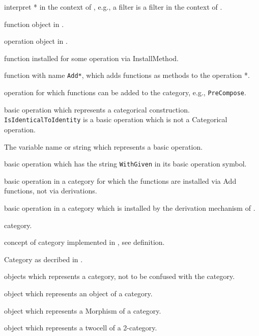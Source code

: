 
\begin{itemize}
 
 \itembold{\GAP *} interpret * in the context of \GAP, e.g., a \GAP filter is
   a filter in the context of \GAP.
 
  function object in \GAP.
 
  operation object in \GAP.
 
  function installed for some operation via InstallMethod.
 
  function with name \texttt{Add*}, which adds functions as methods
   to the operation *.
 
  operation for which functions can be added to the category, e.g., \texttt{PreCompose}.
 
  basic operation which represents a categorical construction. \texttt{IsIdenticalToIdentity}
   is a basic operation which is not a Categorical operation.
 
  The variable name or string which represents a basic operation.
 
  basic operation which has the string \texttt{WithGiven} in its basic operation symbol.
 
  basic operation in a category for which the functions are installed via Add functions, not via
   derivations.
 
  basic operation in a category which is installed by the derivation mechanism of \CapPkg.
 
  \CapPkg category.
 
  concept of category implemented in \CapPkg, see definition.
 
  Category as decribed in \cite{MLCWM}.
 
  \GAP objects which represents a \CapPkg category, not to be confused with the \GAP category.
 
  \GAP object which represents an object of a category.
 
  \GAP object which represents a Morphism of a category.
 
  \GAP object which represents a twocell of a 2-category.
 
 
 
\end{itemize}

